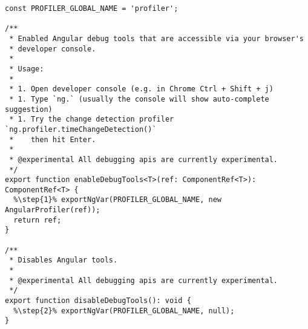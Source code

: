 \begin{verbatim}
const PROFILER_GLOBAL_NAME = 'profiler';

/**
 * Enabled Angular debug tools that are accessible via your browser's
 * developer console.
 *
 * Usage:
 *
 * 1. Open developer console (e.g. in Chrome Ctrl + Shift + j)
 * 1. Type `ng.` (usually the console will show auto-complete suggestion)
 * 1. Try the change detection profiler `ng.profiler.timeChangeDetection()`
 *    then hit Enter.
 *
 * @experimental All debugging apis are currently experimental.
 */
export function enableDebugTools<T>(ref: ComponentRef<T>): ComponentRef<T> {
  %\step{1}% exportNgVar(PROFILER_GLOBAL_NAME, new AngularProfiler(ref));
  return ref;
}

/**
 * Disables Angular tools.
 *
 * @experimental All debugging apis are currently experimental.
 */
export function disableDebugTools(): void {
  %\step{2}% exportNgVar(PROFILER_GLOBAL_NAME, null);
}
\end{verbatim}
